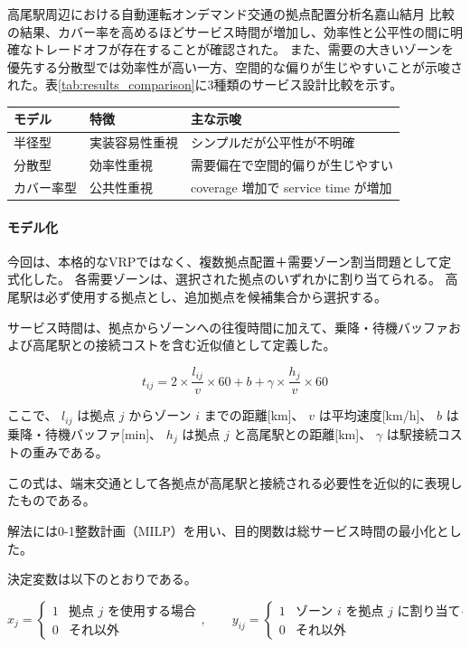\begin{column}{高尾駅周辺における自動運転オンデマンド交通の拠点配置分析}{名嘉山結月}
比較の結果、カバー率を高めるほどサービス時間が増加し、効率性と公平性の間に明確なトレードオフが存在することが確認された。
また、需要の大きいゾーンを優先する分散型では効率性が高い一方、空間的な偏りが生じやすいことが示唆された。表\ref{tab:results_comparison}に3種類のサービス設計比較を示す。

 \begin{center}
   \begin{tabular}{lll}
     \toprule
     モデル & 特徴 & 主な示唆 \\
     \midrule
     半径型 & 実装容易性重視 & シンプルだが公平性が不明確 \\
     分散型 & 効率性重視 & 需要偏在で空間的偏りが生じやすい \\
     カバー率型 & 公共性重視 & coverage 増加で service time が増加 \\
     \bottomrule
   \end{tabular}
   \label{tab:results_comparison}
 \end{center}

\paragraph{モデル化}
今回は、本格的なVRPではなく、複数拠点配置＋需要ゾーン割当問題として定式化した。
各需要ゾーンは、選択された拠点のいずれかに割り当てられる。
高尾駅は必ず使用する拠点とし、追加拠点を候補集合から選択する。

サービス時間は、拠点からゾーンへの往復時間に加えて、乗降・待機バッファおよび高尾駅との接続コストを含む近似値として定義した。

\[
t_{ij}
=
2 \times \frac{l_{ij}}{v} \times 60
+
b
+
\gamma \times \frac{h_j}{v} \times 60
\]

ここで、
$l_{ij}$ は拠点 $j$ からゾーン $i$ までの距離[km]、
$v$ は平均速度[km/h]、
$b$ は乗降・待機バッファ[min]、
$h_j$ は拠点 $j$ と高尾駅との距離[km]、
$\gamma$ は駅接続コストの重みである。

この式は、端末交通として各拠点が高尾駅と接続される必要性を近似的に表現したものである。

解法には0-1整数計画（MILP）を用い、目的関数は総サービス時間の最小化とした。

決定変数は以下のとおりである。

\[
x_j = 
\begin{cases}
1 & \text{拠点 } j \text{ を使用する場合} \\
0 & \text{それ以外}
\end{cases}, \qquad
y_{ij} =
\begin{cases}
1 & \text{ゾーン } i \text{ を拠点 } j \text{ に割り当てる場合} \\
0 & \text{それ以外}
\end{cases}
\]


\end{column}
